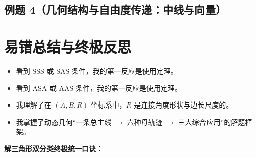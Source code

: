 \documentclass[11pt,a4paper]{ctexart}
\begin{document}
\newpage

\subsection{例题 4（几何结构与自由度传递：中线与向量）}
\qTriangleDofVectorMedianStem

\begin{center}
\qTriangleDofVectorMedianFigure[1.0]
\end{center}




\newpage

\section{易错总结与终极反思}

\begin{tcolorbox}[colback=white,colframe=gray!80,arc=2mm,title=extbf{反思与落实}]
\begin{itemize}[itemsep=0.5em]
  \item[$\square$] 看到 SSS 或 SAS 条件，我的第一反应是使用\blank{3cm}定理。
  \item[$\square$] 看到 ASA 或 AAS 条件，我的第一反应是使用\blank{3cm}定理。
  \item[$\square$] 我理解了在 \((A,B,R)\) 坐标系中，\(R\) 是连接角度形状与边长尺度的\blank{3cm}。
  \item[$\square$] 我掌握了动态几何“一条总主线 \(\to\) 六种母轨迹 \(\to\) 三大综合应用”的解题框架。
\end{itemize}
\end{tcolorbox}

\vspace{1.5em}
\noindent\textbf{解三角形双分类终极统一口诀：}
\vspace{0.8em}

\blank{14cm}
\end{document}
